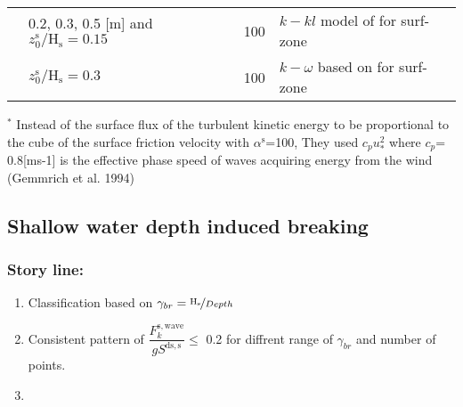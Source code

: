 \documentclass[final]{svjour3}
\begin{document}
\begin{table}
\begin{center}
\begin{tabular}{l p{3cm} c p{5cm} }
      \cite{newberger2007forcing2}  &0.2, 0.3, 0.5 [m] and  ${z_0^\mathrm{s}} / {\mathrm{H}_\mathrm{s}} =
      0.15 $ & 100 & $k-kl$ model of \cite{MellorYamada82} for surf-zone 
      \\
      
      \cite{moghimi2013direct}  &${z_0^\mathrm{s}} / {\mathrm{H}_\mathrm{s}} = 0.3 $ & 100 &  $k-\omega$ 
      based on \cite{Umlauf03a} for surf-zone     \\
      
      \hline
     \end{tabular}
 \end{center}
$^{*}$ Instead of the surface flux of the turbulent kinetic energy to be
proportional to the cube of the surface friction velocity with $\alpha^\mathrm{s}$=100,
They used $c_p u_*^2$ where $c_p$= 0.8[ms-1] is the effective phase speed of waves
acquiring energy from the wind (Gemmrich et al. 1994)
\end{table}





\subsection{Shallow water depth induced breaking}
\subsubsection{Story line:}
\begin{enumerate}
    \item Classification based on
    $\gamma_{br}=\nicefrac{\mathrm{H}_\mathrm{s}}{Depth}$
    \item Consistent pattern of $\dfrac{F_k^\mathrm{s,wave}}{g
    S^{\mathrm{ds,s}}} \leq $ 0.2 for diffrent range of $\gamma_{br}$ and number
    of points.
    \item 
\end{enumerate}
\end{document}
